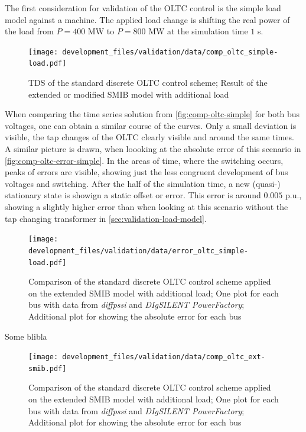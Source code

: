The first consideration for validation of the \acs{OLTC} control is the simple load model against a machine.
The applied load change is shifting the real power of the load from $P=400\text{ MW}$ to $P=800\text{ MW}$ at the simulation time $1$ s.

\begin{figure}[htbp!]
    \centering
    \texttt{[image: development\_files/validation/data/comp\_oltc\_simple-load.pdf]}
    \caption[Time Domain Result of the OLTC control scheme applied on the extended \acs{SMIB} network]{\acf{TDS} of the standard discrete \acs{OLTC} control scheme; Result of the extended or modified \acs{SMIB} model with additional load}
    \label{fig:comp-oltc-simple}
\end{figure}

When comparing the time series solution from \autoref{fig:comp-oltc-simple} for both bus voltages, one can obtain a similar course of the curves. 
Only a small deviation is visible, the tap changes of the \acs{OLTC} clearly visible and around the same times.
A similar picture is drawn, when loooking at the absolute error of this scenario in \autoref{fig:comp-oltc-error-simple}.
In the areas of time, where the switching occurs, peaks of errors are visible, showing just the less congruent development of bus voltages and switching.
After the half of the simulation time, a new (quasi-) stationary state is showign a static offset or error.
This error is around $0.005$ p.u., showing a slightly higher error than when looking at this scenario without the tap changing transformer in \autoref{sec:validation-load-model}.

\begin{figure}[htbp!]
    \centering
    \texttt{[image: development\_files/validation/data/error\_oltc\_simple-load.pdf]}
    \caption[Bus and Error Comparison for the standard discrete \acs{OLTC} scheme applied on the extended \acs{SMIB} model with load]{Comparison of the standard discrete \acs{OLTC} control scheme applied on the extended \acs{SMIB} model with additional load; One plot for each bus with data from \textit{diffpssi} and \textit{DIgSILENT PowerFactory}; Additional plot for showing the absolute error for each bus}
    \label{fig:comp-oltc-error-simple}
\end{figure}

Some blibla

\begin{figure}[htbp!]
    \centering
    \texttt{[image: development\_files/validation/data/comp\_oltc\_ext-smib.pdf]}
    \caption[Bus and Error Comparison for the standard discrete \acs{OLTC} scheme applied on the extended \acs{SMIB} model with load]{Comparison of the standard discrete \acs{OLTC} control scheme applied on the extended \acs{SMIB} model with additional load; One plot for each bus with data from \textit{diffpssi} and \textit{DIgSILENT PowerFactory}; Additional plot for showing the absolute error for each bus}
    \label{fig:comp-oltc-control-ex-smib}
\end{figure}

